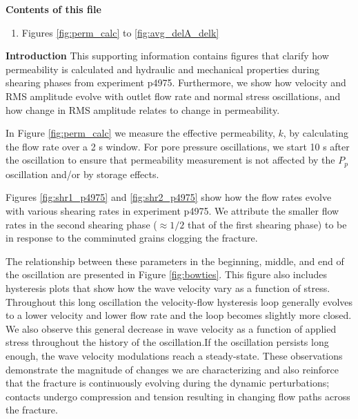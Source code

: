 \documentclass[draft,jgrga]{agutexSI2019}
\begin{document}
\begin{article}

%
%


\noindent\textbf{Contents of this file}

\begin{enumerate}
	\item Figures \ref{fig:perm_calc} to \ref{fig:avg_delA_delk}
\end{enumerate}

\noindent\textbf{Introduction}
This supporting information contains figures that clarify how permeability is calculated and hydraulic and mechanical properties during shearing phases from experiment p4975. Furthermore, we show how velocity and RMS amplitude evolve with outlet flow rate and normal stress oscillations, and how change in RMS amplitude relates to change in permeability. 

In Figure \ref{fig:perm_calc} we measure the effective permeability, $ k $, by calculating the flow rate over a 2 s window. For pore pressure oscillations, we start 10 s after the oscillation to ensure that permeability measurement is not affected by the $ P_p $ oscillation and/or by storage effects. 

Figures  \ref{fig:shr1_p4975} and \ref{fig:shr2_p4975} show how the flow rates evolve with various shearing rates in experiment p4975. We attribute the smaller flow rates in the second shearing phase ($ \approx 1/2$ that of the first shearing phase) to be in response to the comminuted grains clogging the fracture. 

The relationship between these parameters in the beginning, middle, and end of the oscillation are presented in Figure \ref{fig:bowties}. This figure also includes hysteresis plots that show how the wave velocity vary as a function of stress. Throughout this long oscillation the velocity-flow hysteresis loop generally evolves to a lower velocity and lower flow rate and the loop becomes slightly more closed. We also observe this general decrease in wave velocity as a function of applied stress throughout the history of the oscillation.If the oscillation persists long enough, the wave velocity modulations reach a steady-state. These observations demonstrate the magnitude of changes we are characterizing and also reinforce that the fracture is continuously evolving during the dynamic perturbations; contacts undergo compression and tension resulting in changing flow paths across the fracture.


\end{article}
\end{document}

